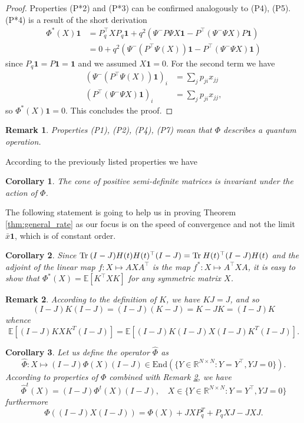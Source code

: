 \documentclass[a4paper,12pt]{article}
\def\tr{\mathrm{Tr}\hspace{0.8mm}}
\newtheorem{cor}{Corollary}
\newtheorem{remark}{Remark}
\begin{document}
\begin{proof}
	Properties (P*2) and (P*3) can be confirmed analogously to (P4), (P5). \\
	(P*4) is a result of the short derivation
	\begin{align*}
		\Phi^*(X)\mathbf 1 &= P_q^\top XP_q\mathbf 1 + q^2(\Psi^- P \Psi X\mathbf 1 - P^\top (\Psi^-\Psi X) P \mathbf 1) \\
		& = 0 + q^2( \Psi^- (P^\top\Psi(X)) \mathbf 1 - P^\top (\Psi^-\Psi X) \mathbf 1) 
	\end{align*}
	since $P_q\mathbf 1 = P\mathbf 1 = \mathbf 1$ and we assumed $X\mathbf 1 = 0$. For the second term we have 
	\begin{align*}
		(\Psi^- (P^\top \Psi(X)) \mathbf 1)_i &=  \sum_j p_{ji}x_{jj} \\
		(P^\top (\Psi^-\Psi X) \mathbf 1)_i & = \sum_{j} p_{ji} x_{jj}, 	
	\end{align*}
	so $\Phi^*(X)\mathbf 1 = 0$. 
	This concludes the proof.
\end{proof}
\begin{remark}
	Properties (P1), (P2), (P4), (P7) 
	mean that $\Phi$ describes a quantum operation.
\end{remark}

\noindent According to the previously listed properties we have
\begin{cor}
	The cone of positive semi-definite matrices is invariant under the action of $\Phi$. 
\end{cor}
\noindent The following statement is going to help us in proving Theorem \ref{thm:general_rate} as our focus is on the speed of convergence and not the limit $\bar x \mathbf 1$, which is of constant order. 
\begin{cor}
	Since $\tr (I-J)H(t)H(t)^\top (I-J) =\tr H(t)^\top (I-J)H(t) $ and the adjoint of the linear map $ f:X \mapsto AXA^\top$ is the map $f^* : X \mapsto A^\top X A $, it is easy to show that $ \Phi^*(X) = \mathbb E[K^\top X K] $ for any symmetric matrix $X$.
\end{cor} 
\begin{remark} \label{rmk:XJ=0} According to the definition of $K$, we have $KJ=J$, and so 
	$$ (I-J)K(I-J) = (I-J)(K-J) = K-JK = (I-J)K $$
	whence
	$$ \mathbb E[(I-J) KXK^T(I-J)] = \mathbb E[(I-J)K(I-J)X(I-J)K^T (I-J)]. $$
\end{remark}
\begin{cor} \label{corr:Phihat}
	Let us define the operator $\widehat \Phi$ as
	$$\widehat \Phi: X\mapsto (I-J)\Phi(X)(I-J) \in \mathrm{End}(\{Y\in \mathbb R^{N\times N} :  Y=Y^\top, YJ=0\}). $$
	According to properties of $\Phi$ combined with Remark \ref{rmk:XJ=0}, we have 
	$$ \widehat \Phi ^t (X) = (I-J) \Phi^t(X) (I-J), \quad X\in\{Y\in \mathbb R^{N\times N} :  Y=Y^\top, YJ=0\} $$
	furthermore
	\begin{equation}
		\label{eq:phiwithoutIJ}
		\Phi((I-J)X(I-J)) = \Phi(X) + JXP_q^T + P_qXJ -JXJ.
	\end{equation}
\end{cor}
\end{document}
